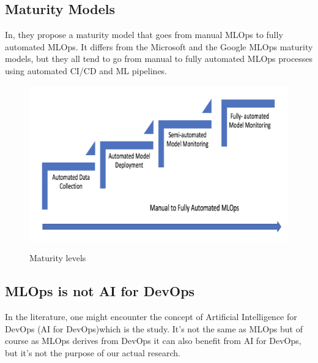 \subsection{Maturity Models}\label{subsec:matutiry-models}
In\cite{mlops-maturity-model}, they propose a maturity model that goes from manual MLOps to fully automated MLOps.
It differs from the Microsoft and the Google MLOps maturity models,
but they all tend to go from manual to fully automated MLOps processes using automated CI/CD and
ML pipelines.\cite{mlops-definition-tools-and-challenge}

\begin{figure}[!htbp]
    \caption{Maturity levels \cite{mlops-maturity-model}}
    \centering
    \includegraphics[scale=0.5]{images/maturity-levels}
    \label{fig:maturity}
\end{figure}


\subsection{MLOps is not AI for DevOps}\label{subsec:mlops-is-not-ai-for-devops}
In the literature, one might encounter the concept of Artificial Intelligence for DevOps (AI for DevOps)which is the study.
It's not the same as MLOps but of course as MLOps derives from DevOps it can also benefit from AI for DevOps,
but it's not the purpose of our actual research.